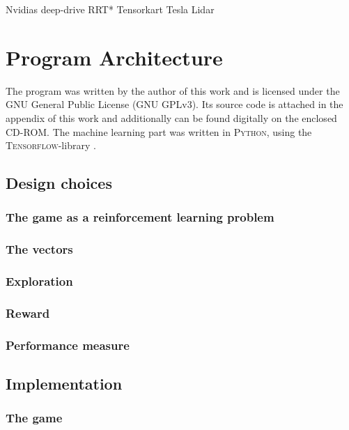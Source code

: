 Nvidias deep-drive
RRT*
Tensorkart
Tesla
Lidar

\chapter{Program Architecture}


The program was written by the author of this work and is licensed under the GNU General Public License (GNU GPLv3). Its source code is attached in the appendix of this work and additionally can be found digitally on the enclosed CD-ROM. The machine learning part was written in \textsc{Python}, using the \textsc{Tensorflow}-library \parencite{abadi_tensorflow:_2015}.

\section{Design choices}

\subsection{The game as a reinforcement learning problem}

\subsection{The vectors}

\subsection{Exploration}

\subsection{Reward}

\subsection{Performance measure}

\section{Implementation}

\subsection{The game}

